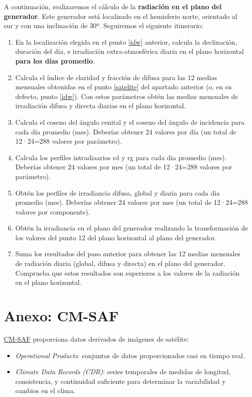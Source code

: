 \documentclass[11pt]{article}
\begin{document}
A continuación, realizaremos el cálculo de la \textbf{radiación en el
  plano del generador}. Este generador está localizado en el
hemisferio norte, orientado al sur y con una inclinación de
30º. Seguiremos el siguiente itinerario:

\begin{enumerate}
\item En la localización elegida en el punto \ref{idw} anterior,
  calcula la declinación, duración del día, e irradiación
  extra-atmosférica diaria en el plano horizontal \textbf{para los
    días promedio}.
\item Calcula el índice de claridad y fracción de difusa para las 12
  medias mensuales obtenidas en el punto \ref{satelite} del apartado
  anterior (o, en su defecto, punto \ref{idw}). Con estos parámetros
  obtén las medias mensuales de irradiación difusa y directa diarias
  en el plano horizontal.
\item Calcula el coseno del ángulo cenital y el coseno del ángulo de
  incidencia para cada día promedio (mes). Deberías obtener 24 valores
  por día (un total de 12·24=288 valores por parámetro).
\item Calcula los perfiles intradiaarios rd y rg para cada dia
  promedio (mes). Deberías obtener 24 valores por mes (un total de
  12·24=288 valores por parámetro).
\item Obtén los perfiles de irradiancia difusa, global y diaria para
  cada día promedio (mes). Deberías obtener 24 valores por mes (un
  total de 12·24=288 valores por componente).
\item Obtén la irradiancia en el plano del generador realizando la
  transformación de los valores del punto 12 del plano horizontal al
  plano del generador.
\item Suma los resultados del paso anterior para obtener las 12 medias
  mensuales de radiación diaria (global, difusa y directa) en el plano
  del generador. Comprueba que estos resultados son superiores a los
  valores de la radiación en el plano horizontal.
\end{enumerate}

\clearpage
\section{Anexo: CM-SAF}
\label{sec:cmsaf}
\href{https://wui.cmsaf.eu/safira/action/viewProduktSearch}{CM-SAF}
proporciona datos derivados de imágenes de satélite:
\begin{itemize}
\item \emph{Operational Products}: conjuntos de datos proporcionados casi en
  tiempo real.

\item \emph{Climate Data Records (CDR)}: series temporales de medidas de
  longitud, consistencia, y continuidad suficiente para determinar la
  variabilidad y cambios en el clima.
\end{itemize}
\end{document}
